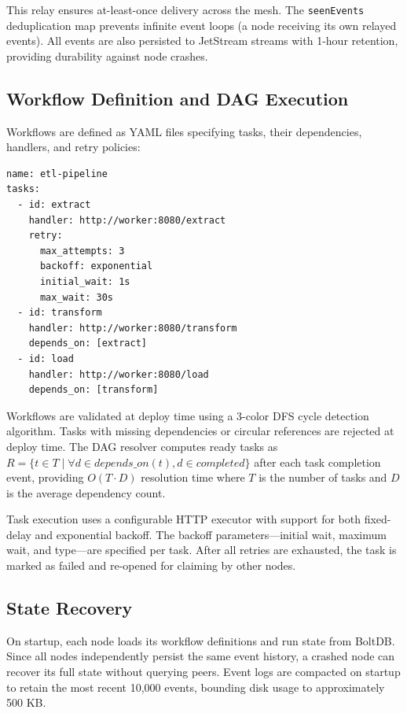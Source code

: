 This relay ensures at-least-once delivery across the mesh. The \texttt{seenEvents} deduplication map prevents infinite event loops (a node receiving its own relayed events). All events are also persisted to JetStream streams with 1-hour retention, providing durability against node crashes.

\subsection{Workflow Definition and DAG Execution}

Workflows are defined as YAML files specifying tasks, their dependencies, handlers, and retry policies:

\begin{lstlisting}[basicstyle=\small\ttfamily, frame=single]
name: etl-pipeline
tasks:
  - id: extract
    handler: http://worker:8080/extract
    retry:
      max_attempts: 3
      backoff: exponential
      initial_wait: 1s
      max_wait: 30s
  - id: transform
    handler: http://worker:8080/transform
    depends_on: [extract]
  - id: load
    handler: http://worker:8080/load
    depends_on: [transform]
\end{lstlisting}

Workflows are validated at deploy time using a 3-color DFS cycle detection algorithm. Tasks with missing dependencies or circular references are rejected at deploy time. The DAG resolver computes ready tasks as $R = \{t \in T \mid \forall d \in depends\_on(t), d \in completed\}$ after each task completion event, providing $O(T \cdot D)$ resolution time where $T$ is the number of tasks and $D$ is the average dependency count.

Task execution uses a configurable HTTP executor with support for both fixed-delay and exponential backoff. The backoff parameters---initial wait, maximum wait, and type---are specified per task. After all retries are exhausted, the task is marked as failed and re-opened for claiming by other nodes.

\subsection{State Recovery}

On startup, each node loads its workflow definitions and run state from BoltDB. Since all nodes independently persist the same event history, a crashed node can recover its full state without querying peers. Event logs are compacted on startup to retain the most recent 10,000 events, bounding disk usage to approximately 500 KB.
